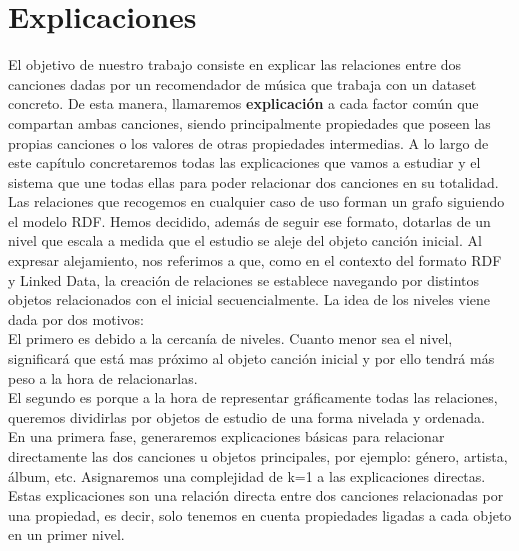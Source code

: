 \chapter{Explicaciones}
\label{cap:Explicaciones}

El objetivo de nuestro trabajo consiste en explicar las relaciones entre dos canciones dadas por un recomendador de música que trabaja con un dataset concreto. De esta manera, llamaremos \textbf{explicación} a cada factor común que compartan ambas canciones, siendo principalmente propiedades que poseen las propias canciones o los valores de otras propiedades intermedias. A lo largo de este capítulo concretaremos todas las explicaciones que vamos a estudiar y el sistema que une todas ellas para poder relacionar dos canciones en su totalidad.\\

Las relaciones que recogemos en cualquier caso de uso forman un grafo siguiendo el modelo RDF. Hemos decidido, además de seguir ese formato, dotarlas de un nivel que escala a medida que el estudio se aleje del objeto canción inicial. Al expresar alejamiento, nos referimos a que, como en el contexto del formato RDF y Linked Data, la creación de relaciones se establece navegando por distintos objetos relacionados con el inicial secuencialmente. La idea de los niveles viene dada por dos motivos:\\

El primero es debido a la cercanía de niveles. Cuanto menor sea el nivel, significará que está mas próximo al objeto canción inicial y por ello tendrá más peso a la hora de relacionarlas.\\

El segundo es porque a la hora de representar gráficamente todas las relaciones, queremos dividirlas por objetos de estudio de una forma nivelada y ordenada.\\

En una primera fase, generaremos explicaciones básicas para relacionar directamente las dos canciones u objetos principales, por ejemplo: género, artista, álbum, etc. Asignaremos una complejidad de k=1 a las explicaciones directas. Estas explicaciones son una relación directa entre dos canciones relacionadas por una propiedad, es decir, solo tenemos en cuenta propiedades ligadas a cada objeto en un primer nivel.\\

